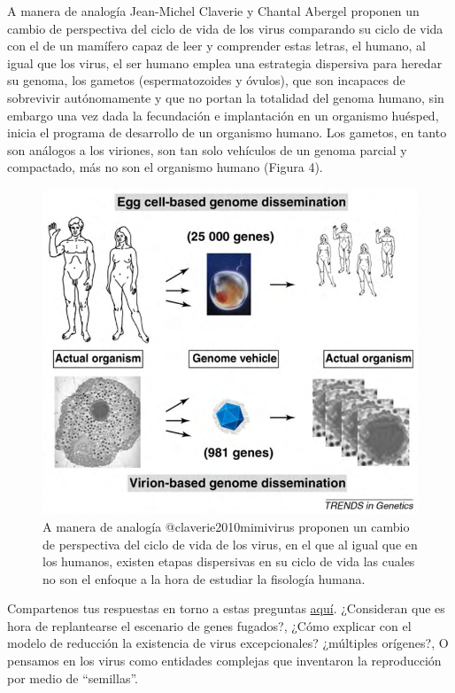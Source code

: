 \documentclass[
  12pt, krantz2,
  spanish,
]{krantz}
\begin{document}
A manera de analogía Jean-Michel Claverie y Chantal Abergel proponen un cambio de perspectiva del ciclo de vida de los virus comparando su ciclo de vida con el de un mamífero capaz de leer y comprender estas letras, el humano, al igual que los virus, el ser humano emplea una estrategia dispersiva para heredar su genoma, los gametos (espermatozoides y óvulos), que son incapaces de sobrevivir autónomamente y que no portan la totalidad del genoma humano, sin embargo una vez dada la fecundación e implantación en un organismo huésped, inicia el programa de desarrollo de un organismo humano. Los gametos, en tanto son análogos a los viriones, son tan solo vehículos de un genoma parcial y compactado, más no son el organismo humano (Figura 4).

\begin{figure}
\includegraphics[width=0.8\linewidth]{figures/analogy} \caption{A manera de analogía @claverie2010mimivirus proponen un cambio de perspectiva del ciclo de vida de los virus, en el que al igual que en los humanos, existen etapas dispersivas en su ciclo de vida las cuales no son el enfoque a la hora de estudiar la fisología humana.}\label{fig:analogy}
\end{figure}

Compartenos tus respuestas en torno a estas preguntas \href{https://www.facebook.com/permalink.php?story_fbid=145223737202449\&id=107088044349352}{aquí}. ¿Consideran que es hora de replantearse el escenario de genes fugados?, ¿Cómo explicar con el modelo de reducción la existencia de virus excepcionales? ¿múltiples orígenes?, O pensamos en los virus como entidades complejas que inventaron la reproducción por medio de ``semillas''.
\end{document}
